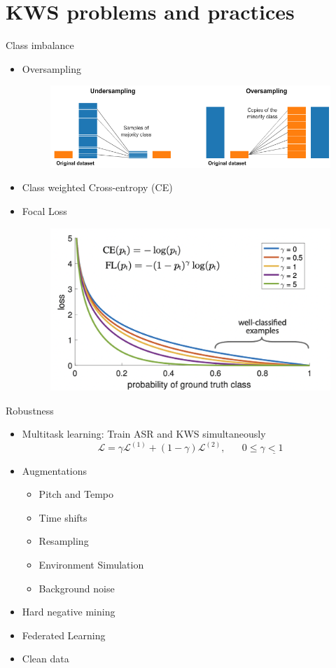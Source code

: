 \section{KWS problems and practices}
\begin{frame}{Class imbalance}
\begin{itemize}
    \item Oversampling 
    \begin{figure}
    	\centering
    	\includegraphics[width=0.65\linewidth]{figs/oversampling_imbalance.png}
    \end{figure}
    \item Class weighted Cross-entropy (CE)
    \item Focal Loss
    \begin{figure}
    	\centering
    	\includegraphics[width=0.65\linewidth]{figs/focal_loss.png}
    \end{figure}
\end{itemize}


\end{frame}
\begin{frame}{Robustness}
\begin{itemize}
    \item Multitask learning: Train ASR and KWS simultaneously
    $$\mathcal{L}=\gamma\mathcal{L}^{(1)}+(1-\gamma)\mathcal{L}^{(2)},\;\;\;\;\;\;0\leq\gamma\underline{{{<1}}}$$
    \item Augmentations
    \begin{itemize}
        \item Pitch and Tempo
        \item Time shifts
        \item Resampling
        \item Environment Simulation
        \item Background noise
    \end{itemize}
    \item Hard negative mining
    \item Federated Learning
    \item Clean data
\end{itemize}
\end{frame}

 

